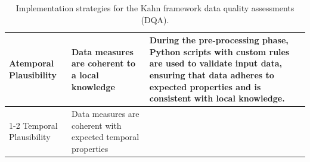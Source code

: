 \begin{table}[htbp]
{\begin{tabular}{lp{5cm}p{9cm}}
Atemporal Plausibility             & Data measures are coherent to a local knowledge                     & \multirow{2}{=}{During the pre-processing phase, Python scripts with custom rules are used to validate input data, ensuring that data adheres to expected properties and is consistent with local knowledge.} \\ \cmidrule(lr){1-2}
Temporal Plausibility              & Data measures are coherent with expected temporal properties        &                                                                                                                \\ \bottomrule
\end{tabular}%
}
\caption{Implementation strategies for the Kahn framework data quality assessments (DQA).}
\label{tab:paper2_kahn-indicators}
\end{table}

